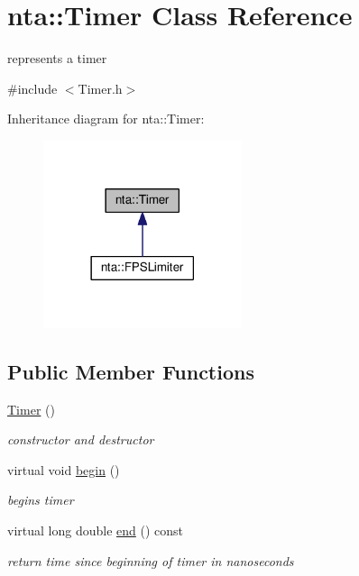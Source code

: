 \hypertarget{classnta_1_1Timer}{}\section{nta\+:\+:Timer Class Reference}
\label{classnta_1_1Timer}


represents a timer  




{\ttfamily \#include $<$Timer.\+h$>$}



Inheritance diagram for nta\+:\+:Timer\+:
\nopagebreak
\begin{figure}[H]
\begin{center}
\leavevmode
\includegraphics[width=165pt]{d3/d1b/classnta_1_1Timer__inherit__graph}
\end{center}
\end{figure}
\subsection*{Public Member Functions}
\begin{DoxyCompactItemize}
\item 
\mbox{\label{classnta_1_1Timer_ac92420dd62672b399f1b4adfd81a4007}} 
\hyperlink{classnta_1_1Timer_ac92420dd62672b399f1b4adfd81a4007}{Timer} ()
\begin{DoxyCompactList}\small\item\em constructor and destructor \end{DoxyCompactList}\item 
\mbox{\label{classnta_1_1Timer_a4192089df7b162096d119a7d9438173f}} 
virtual void \hyperlink{classnta_1_1Timer_a4192089df7b162096d119a7d9438173f}{begin} ()
\begin{DoxyCompactList}\small\item\em begins timer \end{DoxyCompactList}\item 
\mbox{\label{classnta_1_1Timer_adb7a179f51224cca3e4c2f8f8bc20a19}} 
virtual long double \hyperlink{classnta_1_1Timer_adb7a179f51224cca3e4c2f8f8bc20a19}{end} () const
\begin{DoxyCompactList}\small\item\em return time since beginning of timer in nanoseconds \end{DoxyCompactList}\end{DoxyCompactItemize}
